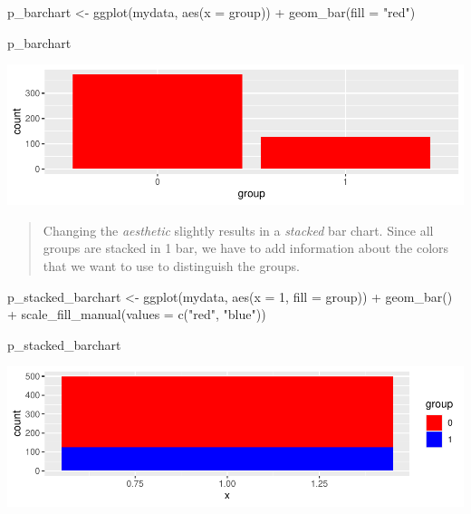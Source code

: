 \documentclass[12pt,]{article}
\newenvironment{Shaded}{}{}
\newcommand{\DataTypeTok}[1]{#1}
\newcommand{\DecValTok}[1]{#1}
\newcommand{\KeywordTok}[1]{\textcolor[rgb]{0.00,0.00,1.00}{#1}}
\newcommand{\NormalTok}[1]{#1}
\newcommand{\OperatorTok}[1]{#1}
\newcommand{\StringTok}[1]{\textcolor[rgb]{0.00,0.50,0.50}{#1}}
\begin{document}
\begin{Shaded}
\begin{Highlighting}[]
\NormalTok{p_barchart <-}\StringTok{ }\KeywordTok{ggplot}\NormalTok{(mydata,}
                     \KeywordTok{aes}\NormalTok{(}\DataTypeTok{x =}\NormalTok{ group)) }\OperatorTok{+}
\StringTok{  }\KeywordTok{geom_bar}\NormalTok{(}\DataTypeTok{fill =} \StringTok{"red"}\NormalTok{) }

\NormalTok{p_barchart}
\end{Highlighting}
\end{Shaded}

\includegraphics{introduction-to-ggplot2_files/figure-latex/unnamed-chunk-13-1.pdf}

\begin{quote}
Changing the \emph{aesthetic} slightly results in a \emph{stacked} bar
chart. Since all groups are stacked in 1 bar, we have to add information
about the colors that we want to use to distinguish the groups.
\end{quote}

\begin{Shaded}
\begin{Highlighting}[]
\NormalTok{p_stacked_barchart <-}\StringTok{ }\KeywordTok{ggplot}\NormalTok{(mydata, }
                             \KeywordTok{aes}\NormalTok{(}\DataTypeTok{x =} \DecValTok{1}\NormalTok{,}
                                 \DataTypeTok{fill =}\NormalTok{ group)) }\OperatorTok{+}
\StringTok{  }\KeywordTok{geom_bar}\NormalTok{() }\OperatorTok{+}
\StringTok{  }\KeywordTok{scale_fill_manual}\NormalTok{(}\DataTypeTok{values =} \KeywordTok{c}\NormalTok{(}\StringTok{"red"}\NormalTok{, }\StringTok{"blue"}\NormalTok{))}

\NormalTok{p_stacked_barchart}
\end{Highlighting}
\end{Shaded}

\includegraphics{introduction-to-ggplot2_files/figure-latex/unnamed-chunk-14-1.pdf}
\end{document}
